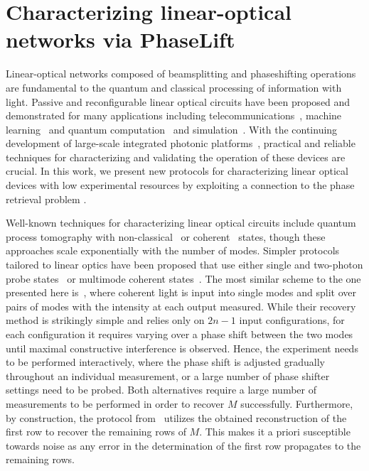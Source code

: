 \chapter{Characterizing linear-optical networks via PhaseLift}%
\label{chap:phaselift}



Linear-optical networks composed of beamsplitting and phaseshifting operations are fundamental to the quantum and classical processing of information with light.
Passive and reconfigurable linear optical circuits have been proposed and demonstrated for many applications including telecommunications~\cite{Miller_2015_Sorting}, machine learning~\cite{Shen_2017_Deep} and quantum computation~\cite{Carolan_2015_Universal} and simulation~\cite{Harris_2017_Quantum}.
With the continuing development of large-scale integrated photonic platforms~\cite{Silverstone_2016_Silicon,Seok_2016_LargeScale}, practical and reliable techniques for characterizing and validating the operation of these devices are crucial.
In this work, we present new protocols for characterizing linear optical devices with low experimental resources by exploiting a connection to the phase retrieval problem \cite{Walther_1963_Question}.

Well-known techniques for characterizing linear optical circuits include quantum process tomography with non-classical~\cite{Brien_2004_Quantum} or coherent~\cite{Keshari_2011_Quantum} states, though these approaches scale exponentially with the number of modes.
Simpler protocols tailored to linear optics have been proposed that use either single and two-photon probe states~\cite{Laing_2012_SuperStable,Dhand_2016_Accurate,Spagnolo_2017_Learning} or multimode coherent states~\cite{Keshari_2013_Direct,Tillmann_2016_On}.
The most similar scheme to the one presented here is~\cite{Keshari_2013_Direct}, where coherent light is input into single modes and split over pairs of modes with the intensity at each output measured.
While their recovery method is strikingly simple and relies only on $2n-1$ input configurations, for each configuration it requires varying over a phase shift between the two modes until maximal constructive interference is observed.
Hence, the experiment needs to be performed interactively, where the phase shift is adjusted gradually throughout an individual measurement, or a large number of phase shifter settings need to be probed.
Both alternatives require a large number of measurements to be performed in order to recover $M$ successfully.
Furthermore, by construction, the protocol from~\cite{Keshari_2013_Direct} utilizes the obtained reconstruction of the first row to recover the remaining rows of $M$.
This makes it a priori susceptible towards noise as any error in the determination of the first row propagates to the remaining rows.

